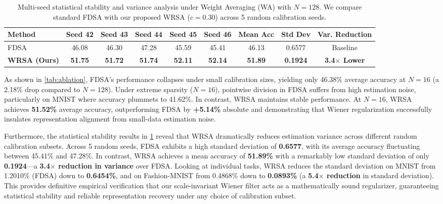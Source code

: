 \documentclass{article}
\theoremstyle{plain}
\theoremstyle{definition}
\theoremstyle{remark}
\begin{document}
\begin{table}[t]
\caption{Multi-seed statistical stability and variance analysis under Weight Averaging (WA) with $N=128$. We compare standard FDSA with our proposed WRSA ($c=0.30$) across 5 random calibration seeds.}
\label{tab:stability}
\vskip 0.1in
\begin{center}
\begin{small}
\begin{tabular}{lcccccccc}
\toprule
\textbf{Method} & \textbf{Seed 42} & \textbf{Seed 43} & \textbf{Seed 44} & \textbf{Seed 45} & \textbf{Seed 46} & \textbf{Mean Acc} & \textbf{Std Dev} & \textbf{Var. Reduction} \\
\midrule
FDSA & 46.08 & 46.30 & 47.28 & 45.59 & 45.41 & 46.13 & 0.6577 & Baseline \\
\textbf{WRSA (Ours)} & \textbf{51.75} & \textbf{51.72} & \textbf{51.74} & \textbf{52.11} & \textbf{52.14} & \textbf{51.89} & \textbf{0.1924} & \textbf{3.4$\times$ Lower} \\
\bottomrule
\end{tabular}
\end{small}
\end{center}
\vskip -0.1in
\end{table}

As shown in \cref{tab:ablation}, FDSA's performance collapses under small calibration sizes, yielding only 46.38\% average accuracy at $N=16$ (a 2.18\% drop compared to $N=128$). Under extreme sparsity ($N=16$), pointwise division in FDSA suffers from high estimation noise, particularly on MNIST where accuracy plummets to 41.62\%. In contrast, WRSA maintains stable performance. At $N=16$, WRSA achieves \textbf{51.52\%} average accuracy, outperforming FDSA by \textbf{+5.14\%} absolute and demonstrating that Wiener regularization successfully insulates representation alignment from small-data estimation noise.

Furthermore, the statistical stability results in \cref{tab:stability} reveal that WRSA dramatically reduces estimation variance across different random calibration subsets. Across 5 random seeds, FDSA exhibits a high standard deviation of \textbf{0.6577}, with its average accuracy fluctuating between 45.41\% and 47.28\%. In contrast, WRSA achieves a mean accuracy of \textbf{51.89\%} with a remarkably low standard deviation of only \textbf{0.1924}---a \textbf{3.4$\times$ reduction in variance} over FDSA. Looking at individual tasks, WRSA reduces the standard deviation on MNIST from 1.2010\% (FDSA) down to \textbf{0.6454\%}, and on Fashion-MNIST from 0.4868\% down to \textbf{0.0893\%} (a \textbf{5.4$\times$ reduction} in standard deviation). This provides definitive empirical verification that our scale-invariant Wiener filter acts as a mathematically sound regularizer, guaranteeing statistical stability and reliable representation recovery under any choice of calibration subset.
\end{document}
